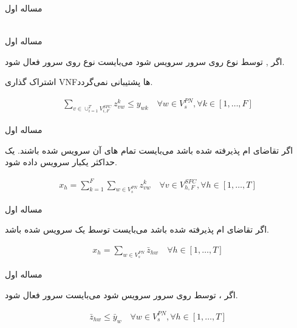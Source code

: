 \documentclass{beamer}
\begin{document}
\begin{persian}
\begin{frame}{مساله اول}
\begin{latin}
\begin{align}
	\end{align}\end{latin}
\end{frame}
\begin{frame}{مساله اول}
	\par
	اگر , 
	توسط  نوع 
	روی سرور  سرویس شود می‌بایست
	 نوع 
	روی سرور  فعال شود.
	\par
	اشتراک گذاری VNFها پشتیبانی نمی‌گردد.
	\begin{latin}\begin{align}
	\sum_{v \in \cup_{i=1}^T V_{i, F}^{SFC}} z_{vw}^k \le y_{wk}
	\quad
	\forall w \in V_s^{PN}, \forall k \in [1,\ldots, F]
	\end{align}\end{latin}
\end{frame}
\begin{frame}{مساله اول}
	\par
	اگر تقاضای ام پذیرفته شده باشد
	می‌بایست تمام های آن‌
	سرویس شده باشند.
	یک  حداکثر یکبار سرویس داده شود.
	\begin{latin}\begin{align}
		x_h = \sum_{k=1}^{F} \sum_{w \in V_{s}^{PN}} z_{vw}^{k}
		\quad
		\forall v \in V_{h,F}^{SFC}, \forall h \in [1,\ldots, T]
	\end{align}\end{latin}
\end{frame}
\begin{frame}{مساله اول}
	\par
	اگر تقاضای ام پذیرفته شده باشد
	می‌بایست توسط یک  سرویس شده باشد.
	\begin{latin}\begin{align}
		x_h = \sum_{w \in V_{s}^{PN}} \bar{z}_{hw}
		\quad
		\forall h \in [1,\ldots, T]
	\end{align}\end{latin}
\end{frame}
\begin{frame}{مساله اول}
	\par
	اگر ، 
	توسط  روی سرور 
	سرویس شود می‌بایست  سرور 
	فعال شود.
	\begin{latin}\begin{align}
		\bar{z}_{hw} \le \bar{y}_w
		\quad
		\forall w \in V_{s}^{PN}, \forall h \in [1,\ldots, T]
	\end{align}\end{latin}
	\par

\end{frame}
\end{persian}
\end{document}
